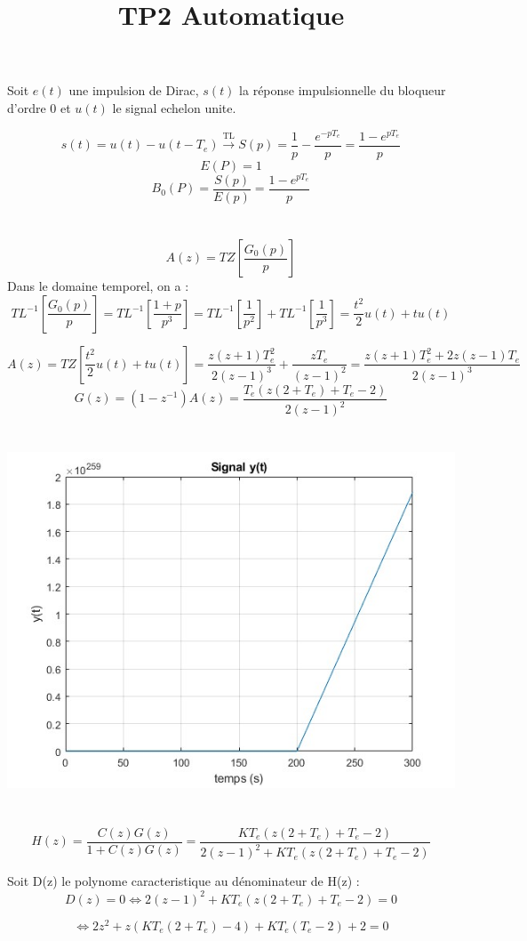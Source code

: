 \documentclass[14pt]{extarticle}
\title{TP2 Automatique}
\begin{document}
\maketitle


\section{}

Soit $e(t)$ une impulsion de Dirac, $s(t)$ la réponse impulsionnelle du bloqueur d'ordre 0 et $u(t)$ le signal echelon unite. 


\[ s(t) = u(t) - u(t-T_e) \xrightarrow{\text{TL}} S(p) = \frac{1}{p} - \frac{e^{-pT_e}}{p} = \frac{1-e^{pT_e}}{p}\]
\[E(P) = 1\] 
\[B_0(P) = \frac{S(p)}{E(p)} = \frac{1-e^{pT_e}}{p}\] 


\section{}
\[A(z) = TZ[\frac{G_0(p)}{p}]\]
Dans le domaine temporel, on a :
\[TL^{-1}[\frac{G_0(p)}{p}] = TL^{-1}[\frac{1+p}{p^3}] = TL^{-1}[\frac{1}{p^2}] + TL^{-1}[\frac{1}{p^3}] = \frac{t^2}{2}u(t) + tu(t)\]

\[A(z) = TZ[\frac{t^2}{2}u(t) + tu(t)] = \frac{z(z+1)T_{e}^2}{2(z-1)^3} + \frac{zT_e}{(z-1)^2} = \frac{z(z+1)T_e^2+2z(z-1)T_e}{2(z-1)^3}\] 
\[G(z)= (1-z^{-1})A(z) = \frac{T_e(z(2+T_e)+T_e -2)}{2(z-1)^2}\]

\section{}

\includegraphics{untitled.jpg}

\section{}
\[H(z) = \frac{C(z)G(z)}{1+C(z)G(z)} = \frac{KT_e(z(2+T_e) + T_e - 2)}{2(z-1)^2 + KT_e(z(2+T_e)+T_e - 2)}\] 

Soit D(z) le polynome caracteristique au dénominateur de H(z) :
\[D(z) = 0 \Leftrightarrow 2(z-1)^2 + KT_e(z(2+T_e)+T_e - 2) = 0 \]

\[\Leftrightarrow 2z^2 + z(KT_e(2+T_e) - 4) + KT_e(T_e - 2) +2 = 0 \]
\end{document}
